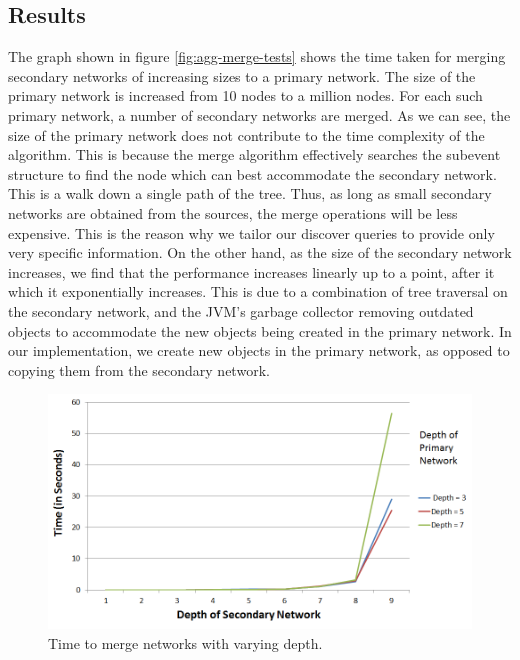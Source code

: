 \subsection{Results}
The graph shown in figure \ref{fig:agg-merge-tests} shows the time taken for merging secondary networks of increasing sizes to a primary network. The size of the primary network is increased from 10 nodes to a million nodes. For each such primary network, a number of secondary networks are merged. As we can see, the size of the primary network does not contribute to the time complexity of the algorithm. This is because the merge algorithm effectively searches the subevent structure to find the node which can best accommodate the secondary network. This is a walk down a single path of the tree. Thus, as long as small secondary networks are obtained from the sources, the merge operations will be less expensive. This is the reason why we tailor our discover queries to provide only very specific information. On the other hand, as the  size of the secondary network increases, we find that the performance increases linearly up to a point, after it which it exponentially increases. This is due to a combination of tree traversal on the secondary network, and the JVM's garbage collector removing outdated objects to accommodate the new objects being created in the primary network. In our implementation, we create new objects in the primary network, as opposed to copying them from the secondary network.

\begin{figure}[t]
\centering
\includegraphics[width=\textwidth]{media/chapter5/axis/perf/mergedepthtest.png}
\caption{Time to merge networks with varying depth.}
\label{fig:agg-depth}
\end{figure}

